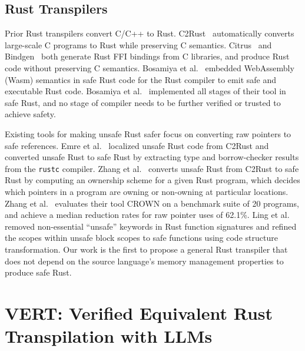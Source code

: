 \documentclass[12pt,openany,oneside,table]{cmuthesis}
\begin{document}
\subsection{Rust Transpilers}

Prior Rust transpilers convert C/C++ to Rust. C2Rust~\cite{C2Rust} automatically converts large-scale C programs to Rust while preserving C semantics. Citrus~\cite{citrus} and Bindgen~\cite{bindgen} both generate Rust FFI bindings from C libraries, and produce Rust code without preserving C semantics. Bosamiya et al.~\cite{bosamiya2022provably} embedded WebAssembly (Wasm) semantics in safe Rust code for the Rust compiler to emit safe and executable Rust code. Bosamiya et al.~\cite{bosamiya2022provably} implemented all stages of their tool in safe Rust, and no stage of compiler needs to be further verified or trusted to achieve safety.

Existing tools for making unsafe Rust safer focus on converting raw pointers to safe references. Emre et al.~\cite{emre2021translating} localized unsafe Rust code from C2Rust and converted unsafe Rust to safe Rust by extracting type and borrow-checker results from the \texttt{rustc} compiler. Zhang et al.~\cite{zhang2023ownership} converts unsafe Rust from C2Rust to safe Rust by computing an ownership scheme for a given Rust program, which decides which pointers in a program are owning or non-owning at particular locations. Zhang et al.~\cite{zhang2023ownership} evaluates their tool CROWN on a benchmark suite of 20 programs, and achieve a median reduction rates for raw pointer uses of 62.1\%. Ling et al.~\cite{ling2022rust} removed non-essential ``unsafe'' keywords in Rust function signatures and refined the scopes within unsafe block scopes to safe functions using code structure transformation. Our work is the first to propose a general Rust transpiler that does not depend on the source language's memory management properties to produce safe Rust.

\section{VERT: Verified Equivalent Rust Transpilation with LLMs}
\label{section:methodology}
\end{document}
